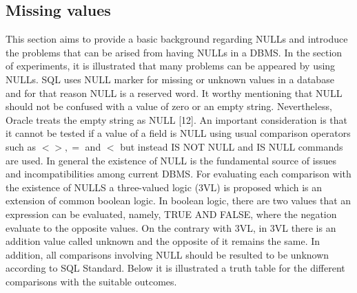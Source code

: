 \subsection{Missing values} 

This section aims to provide a basic background regarding NULLs and introduce the problems that can be arised from having NULLs in a DBMS. In the section of experiments, it is illustrated that many problems can be appeared by using NULLs. SQL uses NULL marker for missing or unknown values in a database and for that reason NULL is a reserved word. It worthy mentioning that NULL should not be confused with a value of zero or an empty string. Nevertheless, Oracle treats the empty string as NULL [12].  An important consideration is that it cannot be tested if a value of a field is NULL using usual comparison operators such as $ <>, = $ and $<$ but instead IS NOT NULL and IS NULL commands are used. In general the existence of NULL is the fundamental source of issues and incompatibilities among current DBMS. For evaluating each comparison with the existence of NULLS a three-valued logic (3VL) is proposed which is an extension of common boolean logic. In boolean logic, there are two values that an expression can be evaluated, namely, TRUE AND FALSE, where the negation evaluate to the opposite values. On the contrary with 3VL, in 3VL there is an addition value called unknown and the opposite of it remains the same. In addition, all comparisons involving NULL should be resulted to be unknown according to SQL Standard. Below it is illustrated a truth table for the different comparisons with the suitable outcomes.    


